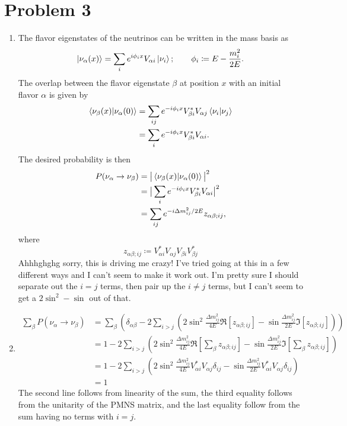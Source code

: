 \documentclass[12pt]{article}
\newcommand{\magsq}[1]{\big|#1\big|^2}
\begin{document}
\section{Problem 3}
\begin{enumerate}[label=(\alph*)]
    \item The flavor eigenstates of the neutrinos can be written in the mass basis as
    \[ \ket{\nu_\alpha(x)} = \sum_i e^{i\phi_i x}V_{\alpha i}\ket{\nu_i}; \qquad \phi_i \coloneqq E - \frac{m_i^2}{2E}. \]
    The overlap between the flavor eigenstate $\beta$ at position $x$ with an initial flavor $\alpha$ is given by
    \begin{align*}
        \braket{\nu_\beta(x)}{\nu_\alpha(0)} &= \sum_{ij} e^{-i\phi_ix}V_{\beta i}^*V_{\alpha j}\braket{\nu_i}{\nu_j} \\
        &= \sum_i e^{-i\phi_i x}V_{\beta i}^* V_{\alpha i}.
    \end{align*}
    The desired probability is then
    \begin{align*}
        P(\nu_\alpha \to \nu_\beta) &= \magsq{\braket{\nu_\beta(x)}{\nu_\alpha(0)}} \\
        &= \magsq{\sum_i e^{-i\phi_i x}V_{\beta i}^* V_{\alpha i}} \\
        &= \sum_{ij}e^{-i\Delta m_{ij}^2/2E} z_{\alpha\beta;ij},
    \end{align*}
    where
    \[ z_{\alpha\beta;ij} \coloneqq V_{\alpha i}^*V_{\alpha j}V_{\beta i}V_{\beta j}^* \]
    Ahhhghghg sorry, this is driving me crazy! I've tried going at this in a few different ways and I can't seem to make it work out. I'm pretty sure I should separate out the $i=j$ terms, then pair up the $i\neq j$ terms, but I can't seem to get a $2\sin^2 - \sin$ out of that.

    \item 
    \begin{align*}
        \sum_\beta P(\nu_\alpha \to \nu_\beta) &= \sum_\beta\left(\delta_{\alpha\beta} - 2\sum_{i>j}\left(2\sin^2\frac{\Delta m_{ij}^2}{4E}\Re[z_{\alpha\beta;ij}] - \sin\frac{\Delta m_{ij}^2}{2E}\Im[z_{\alpha\beta;ij}]\right)\right) \\
        &= 1 - 2\sum_{i>j}\left(2\sin^2\frac{\Delta m_{ij}^2}{4E}\Re[\sum_\beta z_{\alpha\beta;ij}] - \sin\frac{\Delta m_{ij}^2}{2E}\Im[\sum_\beta z_{\alpha\beta;ij}]\right) \\
        &= 1 - 2\sum_{i>j}\left(2\sin^2\frac{\Delta m_{ij}^2}{4E}V_{\alpha i}^*V_{\alpha j}\delta_{ij} - \sin\frac{\Delta m_{ij}^2}{2E}V_{\alpha i}^*V_{\alpha j}\delta_{ij}\right) \\
        &= 1
    \end{align*}
    The second line follows from linearity of the sum, the third equality follows from the unitarity of the PMNS matrix, and the last equality follow from the sum having no terms with $i=j$.


\end{enumerate}
\end{document}
